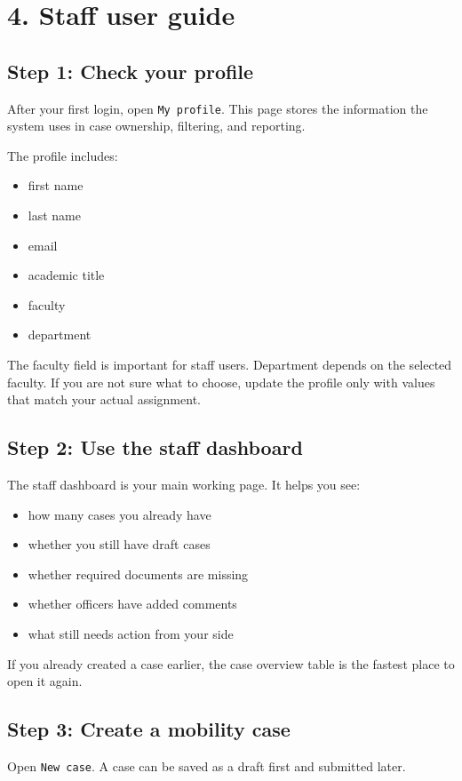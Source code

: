 \documentclass[11pt,a4paper]{article}
\begin{document}
\section*{4. Staff user guide}
\subsection*{Step 1: Check your profile}
After your first login, open \texttt{My profile}. This page stores the information the system uses in case ownership, filtering, and reporting.

The profile includes:

\begin{itemize}
  \item first name
  \item last name
  \item email
  \item academic title
  \item faculty
  \item department
\end{itemize}

The faculty field is important for staff users. Department depends on the selected faculty. If you are not sure what to choose, update the profile only with values that match your actual assignment.

\subsection*{Step 2: Use the staff dashboard}
The staff dashboard is your main working page. It helps you see:

\begin{itemize}
  \item how many cases you already have
  \item whether you still have draft cases
  \item whether required documents are missing
  \item whether officers have added comments
  \item what still needs action from your side
\end{itemize}

If you already created a case earlier, the case overview table is the fastest place to open it again.

\subsection*{Step 3: Create a mobility case}
Open \texttt{New case}. A case can be saved as a draft first and submitted later.
\end{document}
